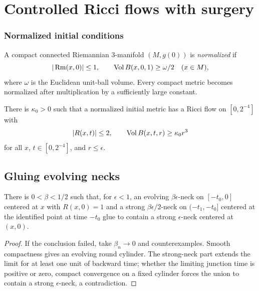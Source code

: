 \chapter{Controlled Ricci flows with surgery}
\label{chap:controlled-ricci-flows}

\subsection{Normalized initial conditions}

A compact connected Riemannian $3$-manifold $(M,g(0))$ is
\emph{normalized} if
\[
  |\operatorname{Rm}(x,0)|\leq1,
  \qquad
  \operatorname{Vol} B(x,0,1)\geq\omega/2
  \quad(x\in M),
\]
where $\omega$ is the Euclidean unit-ball volume. Every compact metric becomes
normalized after multiplication by a sufficiently large constant.

\begin{claim}
\label{claim:normalized-initial-existence}
\label{newkappa0r0t0}

There is $\kappa_0>0$ such that a normalized initial metric has a Ricci flow
on $[0,2^{-4}]$ with
\[
  |R(x,t)|\leq2,
  \qquad
  \operatorname{Vol} B(x,t,r)\geq\kappa_0r^3
\]
for all $x$, $t\in[0,2^{-4}]$, and $r\leq\epsilon$.
\end{claim}

\section{Gluing evolving necks}

\begin{proposition}
\label{prop:neck-gluing}

\label{neckglue}
There is $0<\beta<1/2$ such that, for $\epsilon<1$, an evolving
$\beta\epsilon$-neck on $[-t_0,0]$ centered at $x$ with $R(x,0)=1$ and a
strong $\beta\epsilon/2$-neck on $(-t_1,-t_0]$ centered at the identified point
at time $-t_0$ glue to contain a strong $\epsilon$-neck centered at $(x,0)$.
\end{proposition}

\begin{proof}
\sketch
If the conclusion failed, take $\beta_n\to0$ and counterexamples. Smooth
compactness gives an evolving round cylinder. The strong-neck part extends the
limit for at least one unit of backward time; whether the limiting junction time
is positive or zero, compact convergence on a fixed cylinder forces the union to
contain a strong $\epsilon$-neck, a contradiction.
\end{proof}

